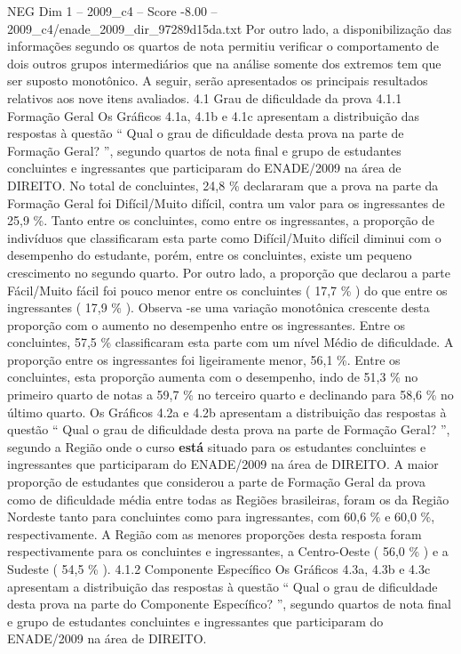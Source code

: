 \begin{textsample}{NEG Dim 1 – 2009\_c4 – Score -8.00 – 2009\_c4/enade\_2009\_dir\_97289d15da.txt}
Por outro lado, a disponibilização das informações segundo os quartos de nota permitiu verificar o comportamento de dois outros grupos intermediários que na análise somente dos extremos tem que ser suposto monotônico.
A seguir, serão apresentados os principais resultados relativos aos nove itens avaliados. 4.1 Grau de dificuldade da prova 4.1.1 Formação Geral Os Gráficos 4.1a, 4.1b e 4.1c apresentam a distribuição das respostas à questão “ Qual o grau de dificuldade desta prova na parte de Formação Geral? ”, segundo quartos de nota final e grupo de estudantes concluintes e ingressantes que participaram do ENADE/2009 na área de DIREITO.
No total de concluintes, 24,8 \% declararam que a prova na parte da Formação Geral foi Difícil/Muito difícil, contra um valor para os ingressantes de 25,9 \%.
Tanto entre os concluintes, como entre os ingressantes, a proporção de indivíduos que classificaram esta parte como Difícil/Muito difícil diminui com o desempenho do estudante, porém, entre os concluintes, existe um pequeno crescimento no segundo quarto.
Por outro lado, a proporção que declarou a parte Fácil/Muito fácil foi pouco menor entre os concluintes ( 17,7 \% ) do que entre os ingressantes ( 17,9 \% ).
Observa -se uma variação monotônica crescente desta proporção com o aumento no desempenho entre os ingressantes.
Entre os concluintes, 57,5 \% classificaram esta parte com um nível Médio de dificuldade.
A proporção entre os ingressantes foi ligeiramente menor, 56,1 \%.
Entre os concluintes, esta proporção aumenta com o desempenho, indo de 51,3 \% no primeiro quarto de notas a 59,7 \% no terceiro quarto e declinando para 58,6 \% no último quarto.
Os Gráficos 4.2a e 4.2b apresentam a distribuição das respostas à questão “ Qual o grau de dificuldade desta prova na parte de Formação Geral? ”, segundo a Região onde o curso \textbf{está} situado para os estudantes concluintes e ingressantes que participaram do ENADE/2009 na área de DIREITO.
A maior proporção de estudantes que considerou a parte de Formação Geral da prova como de dificuldade média entre todas as Regiões brasileiras, foram os da Região Nordeste tanto para concluintes como para ingressantes, com 60,6 \% e 60,0 \%, respectivamente.
A Região com as menores proporções desta resposta foram respectivamente para os concluintes e ingressantes, a Centro-Oeste ( 56,0 \% ) e a Sudeste ( 54,5 \% ). 4.1.2 Componente Específico Os Gráficos 4.3a, 4.3b e 4.3c apresentam a distribuição das respostas à questão “ Qual o grau de dificuldade desta prova na parte do Componente Específico? ”, segundo quartos de nota final e grupo de estudantes concluintes e ingressantes que participaram do ENADE/2009 na área de DIREITO.

\end{textsample}

